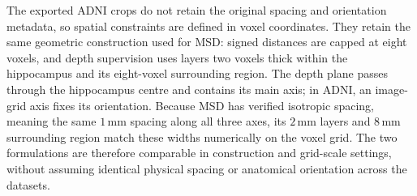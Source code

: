 \documentclass[12pt,a4paper]{article}
\begin{document}
The exported ADNI crops do not retain the original spacing and orientation
metadata, so spatial constraints are defined in voxel coordinates. They
retain the same geometric construction used for MSD: signed distances are
capped at eight voxels, and depth supervision uses layers two voxels thick
within the hippocampus and its eight-voxel surrounding region. The depth
plane passes through the hippocampus centre and contains its main axis; in
ADNI, an image-grid axis fixes its orientation. Because MSD has verified
isotropic spacing, meaning the same $1\,\mathrm{mm}$ spacing along all three
axes, its $2\,\mathrm{mm}$ layers and $8\,\mathrm{mm}$ surrounding region
match these widths numerically on the voxel grid. The two formulations are
therefore comparable in construction and grid-scale settings, without
assuming identical physical spacing or anatomical orientation across the
datasets.
\end{document}
